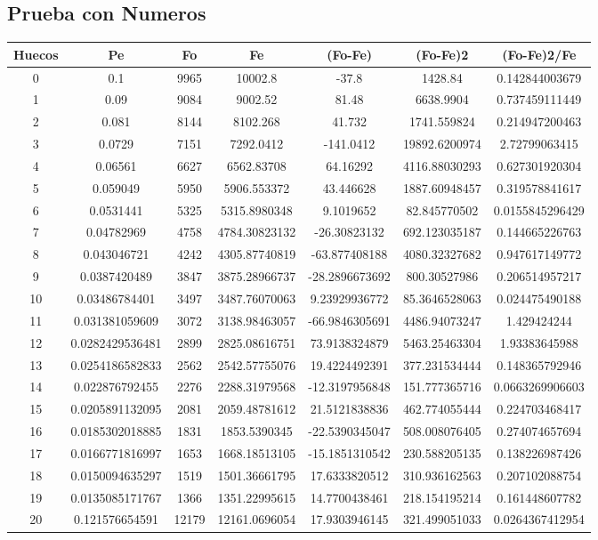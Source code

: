 \documentclass{article}
\begin{document}
\subsection{Prueba con Numeros}
\begin{tabular}{|c|c|c|c|c|c|c|}
Huecos&Pe&Fo&Fe&(Fo{-}Fe)&(Fo{-}Fe)2&(Fo{-}Fe)2/Fe\\
\hline
0&0.1&9965&10002.8&{-}37.8&1428.84&0.142844003679\\
\hline
1&0.09&9084&9002.52&81.48&6638.9904&0.737459111449\\
\hline
2&0.081&8144&8102.268&41.732&1741.559824&0.214947200463\\
\hline
3&0.0729&7151&7292.0412&{-}141.0412&19892.6200974&2.72799063415\\
\hline
4&0.06561&6627&6562.83708&64.16292&4116.88030293&0.627301920304\\
\hline
5&0.059049&5950&5906.553372&43.446628&1887.60948457&0.319578841617\\
\hline
6&0.0531441&5325&5315.8980348&9.1019652&82.845770502&0.0155845296429\\
\hline
7&0.04782969&4758&4784.30823132&{-}26.30823132&692.123035187&0.144665226763\\
\hline
8&0.043046721&4242&4305.87740819&{-}63.877408188&4080.32327682&0.947617149772\\
\hline
9&0.0387420489&3847&3875.28966737&{-}28.2896673692&800.30527986&0.206514957217\\
\hline
10&0.03486784401&3497&3487.76070063&9.23929936772&85.3646528063&0.024475490188\\
\hline
11&0.031381059609&3072&3138.98463057&{-}66.9846305691&4486.94073247&1.429424244\\
\hline
12&0.0282429536481&2899&2825.08616751&73.9138324879&5463.25463304&1.93383645988\\
\hline
13&0.0254186582833&2562&2542.57755076&19.4224492391&377.231534444&0.148365792946\\
\hline
14&0.022876792455&2276&2288.31979568&{-}12.3197956848&151.777365716&0.0663269906603\\
\hline
15&0.0205891132095&2081&2059.48781612&21.5121838836&462.774055444&0.224703468417\\
\hline
16&0.0185302018885&1831&1853.5390345&{-}22.5390345047&508.008076405&0.274074657694\\
\hline
17&0.0166771816997&1653&1668.18513105&{-}15.1851310542&230.588205135&0.138226987426\\
\hline
18&0.0150094635297&1519&1501.36661795&17.6333820512&310.936162563&0.207102088754\\
\hline
19&0.0135085171767&1366&1351.22995615&14.7700438461&218.154195214&0.161448607782\\
\hline
20&0.121576654591&12179&12161.0696054&17.9303946145&321.499051033&0.0264367412954\\
\end{tabular}
\end{document}
